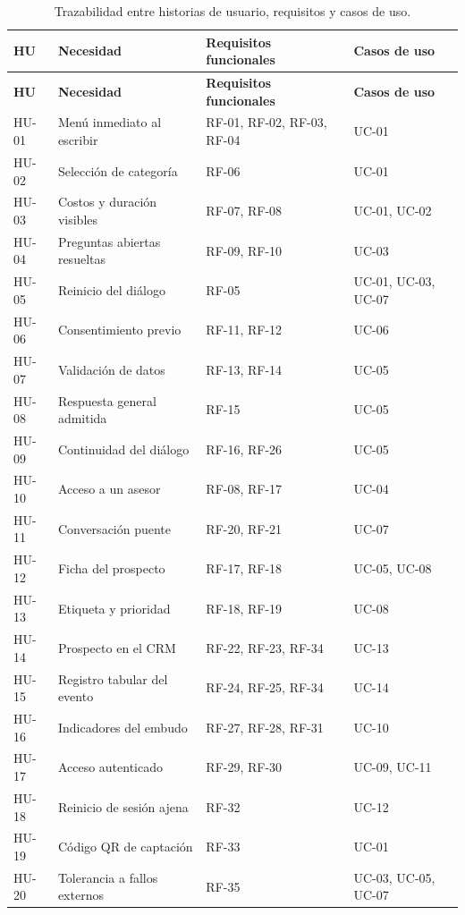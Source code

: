 \documentclass[12pt,a4paper]{report}
\newcommand{\tablacompacta}{\setstretch{1.1}\small}
\newcommand{\cabecera}[1]{\rowcolor{filacabecera}#1}
\begin{document}
{\tablacompacta
\begin{longtable}{p{1.5cm}p{5.2cm}p{5.0cm}p{3.0cm}}
\caption{Trazabilidad entre historias de usuario, requisitos y casos de uso.}\label{tab:trazabilidad}\\
\toprule
\cabecera{\textbf{HU}} & \textbf{Necesidad} & \textbf{Requisitos funcionales} & \textbf{Casos de uso} \\
\midrule
\endfirsthead
\toprule
\textbf{HU} & \textbf{Necesidad} & \textbf{Requisitos funcionales} & \textbf{Casos de uso} \\
\midrule
\endhead
\bottomrule
\endfoot
HU-01 & Menú inmediato al escribir & RF-01, RF-02, RF-03, RF-04 & UC-01 \\
HU-02 & Selección de categoría & RF-06 & UC-01 \\
HU-03 & Costos y duración visibles & RF-07, RF-08 & UC-01, UC-02 \\
HU-04 & Preguntas abiertas resueltas & RF-09, RF-10 & UC-03 \\
HU-05 & Reinicio del diálogo & RF-05 & UC-01, UC-03, UC-07 \\
HU-06 & Consentimiento previo & RF-11, RF-12 & UC-06 \\
HU-07 & Validación de datos & RF-13, RF-14 & UC-05 \\
HU-08 & Respuesta general admitida & RF-15 & UC-05 \\
HU-09 & Continuidad del diálogo & RF-16, RF-26 & UC-05 \\
HU-10 & Acceso a un asesor & RF-08, RF-17 & UC-04 \\
HU-11 & Conversación puente & RF-20, RF-21 & UC-07 \\
HU-12 & Ficha del prospecto & RF-17, RF-18 & UC-05, UC-08 \\
HU-13 & Etiqueta y prioridad & RF-18, RF-19 & UC-08 \\
HU-14 & Prospecto en el CRM & RF-22, RF-23, RF-34 & UC-13 \\
HU-15 & Registro tabular del evento & RF-24, RF-25, RF-34 & UC-14 \\
HU-16 & Indicadores del embudo & RF-27, RF-28, RF-31 & UC-10 \\
HU-17 & Acceso autenticado & RF-29, RF-30 & UC-09, UC-11 \\
HU-18 & Reinicio de sesión ajena & RF-32 & UC-12 \\
HU-19 & Código QR de captación & RF-33 & UC-01 \\
HU-20 & Tolerancia a fallos externos & RF-35 & UC-03, UC-05, UC-07 \\
\end{longtable}}
\end{document}
